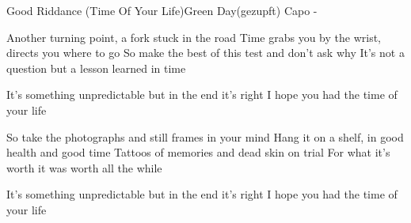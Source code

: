 \begin{song}{Good Riddance (Time Of Your Life)}{Green Day}{(gezupft) Capo -}


Another turning point, a fork stuck in the road
  Time grabs you by the wrist, directs you where to go
  So make the best of this test and don't ask why
  It's not a question but a lesson learned in time

It's something unpredictable but in the end it's right
I hope you had the time of your life


So take the photographs and still frames in your mind
  Hang it on a shelf, in good health and good time
  Tattoos of memories and dead skin on trial
  For what it's worth it was worth all the while

It's something unpredictable but in the end it's right
I hope you had the time of your life



\end{song}
